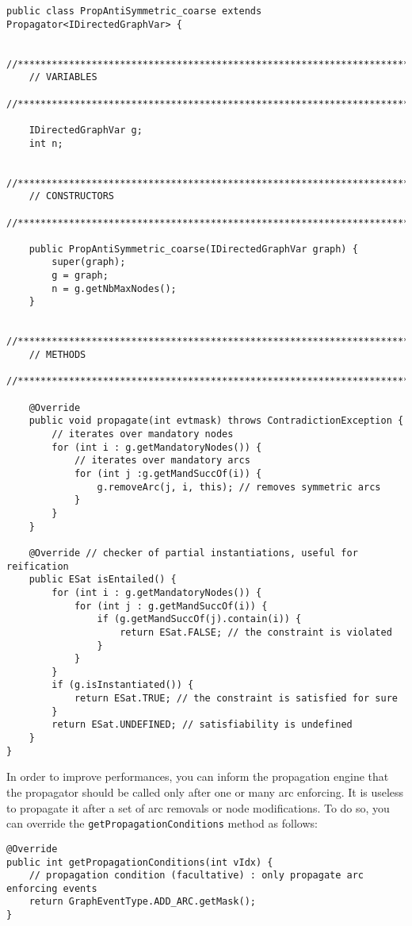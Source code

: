 \documentclass{article}
\begin{document}
\begin{lstlisting}
public class PropAntiSymmetric_coarse extends Propagator<IDirectedGraphVar> {

    //*****************************************************************************
    // VARIABLES
    //*****************************************************************************

    IDirectedGraphVar g;
    int n;

    //*****************************************************************************
    // CONSTRUCTORS
    //*****************************************************************************

    public PropAntiSymmetric_coarse(IDirectedGraphVar graph) {
        super(graph);
        g = graph;
        n = g.getNbMaxNodes();
    }

    //*****************************************************************************
    // METHODS
    //*****************************************************************************

    @Override
    public void propagate(int evtmask) throws ContradictionException {
        // iterates over mandatory nodes
        for (int i : g.getMandatoryNodes()) {
            // iterates over mandatory arcs
            for (int j :g.getMandSuccOf(i)) {
                g.removeArc(j, i, this); // removes symmetric arcs
            }
        }
    }

    @Override // checker of partial instantiations, useful for reification
    public ESat isEntailed() {
        for (int i : g.getMandatoryNodes()) {
            for (int j : g.getMandSuccOf(i)) {
                if (g.getMandSuccOf(j).contain(i)) {
                    return ESat.FALSE; // the constraint is violated
                }
            }
        }
        if (g.isInstantiated()) {
            return ESat.TRUE; // the constraint is satisfied for sure
        }
        return ESat.UNDEFINED; // satisfiability is undefined
    }
}
\end{lstlisting}

In order to improve performances, you can inform the propagation engine that the propagator should be called only after one or many arc enforcing. It is useless to propagate it after a set of arc removals or node modifications. 
To do so, you can override the \texttt{getPropagationConditions} method as follows:
\begin{lstlisting}
@Override
public int getPropagationConditions(int vIdx) {
	// propagation condition (facultative) : only propagate arc enforcing events
	return GraphEventType.ADD_ARC.getMask();
}
\end{lstlisting}
\end{document}
